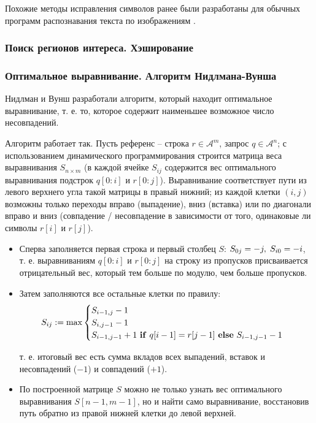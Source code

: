 \documentclass{main.tex}[subfiles]
\begin{document}
Похожие методы исправления символов ранее были разработаны для обычных программ распознавания текста по изображениям \cite{muller2021word_aln}.

\subsubsection{Поиск регионов интереса. Хэширование}


\subsubsection{Оптимальное выравнивание. Алгоритм Нидлмана-Вунша}

Нидлман и Вунш \cite{needleman1970} разработали алгоритм, который находит оптимальное выравнивание, т. е. то, которое содержит наименьшее возможное число несовпадений.

Алгоритм работает так.
Пусть референс -- строка $r \in \mathcal{A}^m $, запрос $q \in \mathcal{A}^n$; с использованием динамического программирования строится матрица веса выравнивания $S_{n\times m}$ (в каждой ячейке $S_{ij}$ содержится вес оптимального выравнивания подстрок $q[0:i]$ и $r[0:j]$). %
Выравнивание соответствует пути из левого верхнего угла такой матрицы в правый нижний; из каждой клетки $(i,j)$ возможны только переходы вправо (выпадение), вниз (вставка) или по диагонали вправо и вниз (совпадение / несовпадение в зависимости от того, одинаковые ли символы $r[i]$ и $r[j]$).
\begin{itemize}
    \item Сперва заполняется первая строка и первый столбец $S$: $S_{0j} = -j, \thickspace S_{i0} = -i$, т. е. выравниваниям $q[0:i]$ и  $r[0:j]$ на строку из пропусков присваивается отрицательный вес, который тем больше по модулю, чем больше пропусков.
    \item Затем заполняются все остальные клетки по правилу:
    \[ S_{ij} := \max \begin{cases}
        S_{i-1,j} - 1 \\
        S_{i,j-1} - 1 \\
        S_{i-1,j-1} + 1 \text{ \textbf{if} } q[i-1] = r[j-1] \text{ \textbf{else} } S_{i-1,j-1} - 1
    \end{cases} \]

    т. е. итоговый вес есть сумма вкладов всех выпадений, вставок и несовпадений ($-1$) и совпадений ($+1$).
    \item По построенной матрице $ S $ можно не только узнать вес оптимального выравнивания $S[n-1,m-1]$, но и найти само выравнивание, восстановив путь обратно из правой нижней клетки до левой верхней.

\end{itemize}
\end{document}
